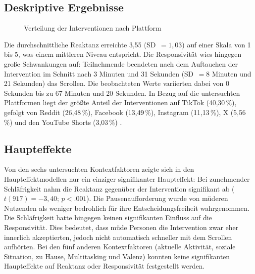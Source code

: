 \documentclass[11pt,a4paper]{article}
\begin{document}
\subsection{Deskriptive Ergebnisse}

\begin{figure}[htbp]
  \centering
  \caption{Verteilung der Interventionen nach Plattform \citep{meinhardt2025scrolling}}
  \label{fig:platform-distribution}
\end{figure}

Die durchschnittliche Reaktanz erreichte 3,55 (SD~$=1{,}03$) auf einer Skala von 1 bis 5,
was einem mittleren Niveau entspricht. Die Responsivität wies hingegen große Schwankungen
auf: Teilnehmende beendeten nach dem Auftauchen der Intervention im Schnitt nach 3 Minuten
und 31 Sekunden (SD~$=8$ Minuten und 21 Sekunden) das Scrollen. Die beobachteten Werte
variierten dabei von 0 Sekunden bis zu 67 Minuten und 20 Sekunden. In Bezug auf die
untersuchten Plattformen liegt der größte Anteil der Interventionen auf TikTok (40,30\,\%),
gefolgt von Reddit (26,48\,\%), Facebook (13,49\,\%), Instagram (11,13\,\%), X (5,56\,\%)
und den YouTube Shorts (3,03\,\%) \citep{meinhardt2025scrolling}.

\subsection{Haupteffekte}

Von den sechs untersuchten Kontextfaktoren zeigte sich in den Haupteffektmodellen nur ein
einziger signifikanter Haupteffekt: Bei zunehmender Schläfrigkeit nahm die Reaktanz
gegenüber der Intervention signifikant ab ($t(917)=-3{,}40$; $p<.001$). Die
Pausenaufforderung wurde von müderen Nutzenden als weniger bedrohlich für ihre
Entscheidungsfreiheit wahrgenommen. Die Schläfrigkeit hatte hingegen keinen signifikanten
Einfluss auf die Responsivität. Dies bedeutet, dass müde Personen die Intervention zwar eher
innerlich akzeptierten, jedoch nicht automatisch schneller mit dem Scrollen aufhörten. Bei
den fünf anderen Kontextfaktoren (aktuelle Aktivität, soziale Situation, zu Hause,
Multitasking und Valenz) konnten keine signifikanten Haupteffekte auf Reaktanz oder
Responsivität festgestellt werden.
\end{document}
